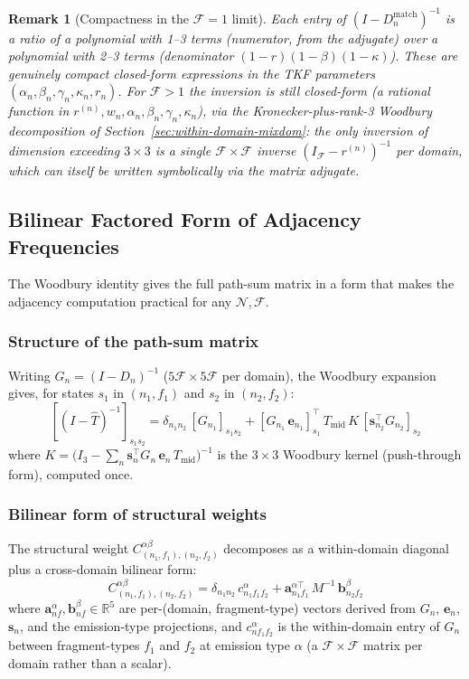 \documentclass{article}
\newtheorem{remark}{Remark}
\newcommand\ext{r}
\newcommand\dom{n}
\newcommand\ndom{\mathcal{N}}
\newcommand\nfrag{\mathcal{F}}
\newcommand\fragdist{w}
\newcommand\nonemptytrans{T}
\newcommand\effT{\hat{T}}
\newcommand\frag{f}
\begin{document}
\begin{remark}[Compactness in the $\nfrag = 1$ limit]
Each entry of $(I - D_\dom^{\text{match}})^{-1}$ is a ratio of a polynomial
with 1--3 terms (numerator, from the adjugate) over a polynomial with 2--3 terms
(denominator $(1-\ext)(1-\beta)(1-\kappa)$). These are genuinely compact
closed-form expressions in the TKF parameters
$(\alpha_\dom, \beta_\dom, \gamma_\dom, \kappa_\dom, \ext_\dom)$.
For $\nfrag > 1$ the inversion is still closed-form (a rational
function in $\ext^{(\dom)}, \fragdist_\dom, \alpha_\dom, \beta_\dom,
\gamma_\dom, \kappa_\dom$), via the Kronecker-plus-rank-3 Woodbury
decomposition of Section~\ref{sec:within-domain-mixdom}: the only
inversion of dimension exceeding $3 \times 3$ is a single
$\nfrag \times \nfrag$ inverse $(I_\nfrag - \ext^{(\dom)})^{-1}$ per
domain, which can itself be written symbolically via the matrix
adjugate.
\end{remark}


\subsection{Bilinear Factored Form of Adjacency Frequencies}

The Woodbury identity gives the full path-sum matrix in a form that
makes the adjacency computation practical for any $\ndom, \nfrag$.

\subsubsection{Structure of the path-sum matrix}

Writing $G_\dom = (I - D_\dom)^{-1}$ ($5\nfrag \times 5\nfrag$ per
domain), the Woodbury expansion gives, for states $s_1$ in
$(\dom_1, \frag_1)$ and $s_2$ in $(\dom_2, \frag_2)$:
\[
[(I - \effT)^{-1}]_{s_1 s_2}
= \delta_{\dom_1\dom_2}\,[G_{\dom_1}]_{s_1 s_2}
+ [G_{\dom_1}\,\mathbf{e}_{\dom_1}]_{s_1}^\top\,
  \nonemptytrans_\text{mid}\,K\,
  [\mathbf{s}_{\dom_2}^\top G_{\dom_2}]_{s_2}
\]
where $K = \bigl(I_3 - \sum_\dom \mathbf{s}_\dom^\top G_\dom\, \mathbf{e}_\dom\,
\nonemptytrans_\text{mid}\bigr)^{-1}$
is the $3 \times 3$ Woodbury kernel (push-through form), computed once.

\subsubsection{Bilinear form of structural weights}

The structural weight $C^{\alpha\beta}_{(\dom_1,\frag_1),(\dom_2,\frag_2)}$
decomposes as a within-domain diagonal plus a cross-domain bilinear form:
\[
C^{\alpha\beta}_{(\dom_1,\frag_1),(\dom_2,\frag_2)}
= \delta_{\dom_1\dom_2}\, c^\alpha_{\dom_1\frag_1\frag_2}
+ \mathbf{a}^{\alpha\top}_{\dom_1\frag_1}\, M^{-1}\, \mathbf{b}^{\beta}_{\dom_2\frag_2}
\]
where $\mathbf{a}^\alpha_{\dom\frag}, \mathbf{b}^\beta_{\dom\frag} \in \mathbb{R}^5$
are per-(domain, fragment-type) vectors derived from $G_\dom$,
$\mathbf{e}_\dom$, $\mathbf{s}_\dom$, and the emission-type projections,
and $c^\alpha_{\dom\frag_1\frag_2}$ is the within-domain entry of
$G_\dom$ between fragment-types $\frag_1$ and $\frag_2$ at emission
type $\alpha$ (a $\nfrag \times \nfrag$ matrix per domain rather than a
scalar).
\end{document}

